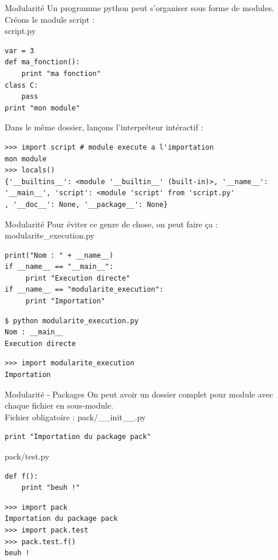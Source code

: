 \documentclass{beamer}
\begin{document}
\begin{frame}[fragile]{Modularité}
Un programme python peut s'organiser sous forme de modules.\\
Créons le module script :\\
script.py\\
\begin{lstlisting}
var = 3
def ma_fonction():
    print "ma fonction"
class C:
    pass
print "mon module"
\end{lstlisting}
Dans le même dossier, lançons l'interpréteur intéractif :
\begin{lstlisting}[basicstyle=\tiny]
>>> import script # module execute a l'importation
mon module
>>> locals()
{'__builtins__': <module '__builtin__' (built-in)>, '__name__':
'__main__', 'script': <module 'script' from 'script.py'
, '__doc__': None, '__package__': None}
\end{lstlisting}
\end{frame}

\begin{frame}[fragile]{Modularité}
Pour éviter ce genre de chose, on peut faire ça :
modularite\_execution.py
\begin{lstlisting}
print("Nom : " + __name__)
if __name__ == "__main__":
     print "Execution directe"
if __name__ == "modularite_execution":
     print "Importation"
\end{lstlisting}
\begin{lstlisting}[language=bash]
$ python modularite_execution.py 
Nom : __main__
Execution directe
\end{lstlisting}
\begin{lstlisting}
>>> import modularite_execution
Importation
\end{lstlisting}
\end{frame}

\begin{frame}[fragile]{Modularité - Packages}
On peut avoir un dossier complet pour module avec chaque fichier en sous-module.\\
Fichier obligatoire : pack/\_\_init\_\_.py
\begin{lstlisting}
print "Importation du package pack"
\end{lstlisting}
pack/test.py
\begin{lstlisting}
def f():
    print "beuh !"
\end{lstlisting}
\begin{lstlisting}
>>> import pack
Importation du package pack
>>> import pack.test
>>> pack.test.f()
beuh !
\end{lstlisting}

\end{frame}
\end{document}

